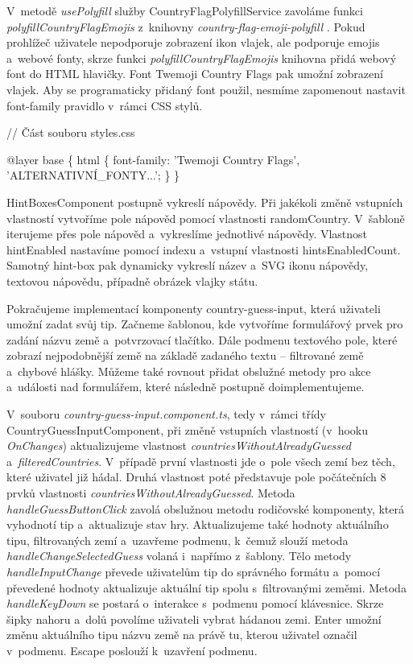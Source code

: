 V~metodě \emph{usePolyfill} služby CountryFlagPolyfillService zavoláme funkci \emph{polyfillCountryFlagEmojis} z~knihovny \emph{country-flag-emoji-polyfill} \cite{countryflagemojipolyfill}. 
Pokud prohlížeč uživatele nepodporuje zobrazení ikon vlajek, ale podporuje emojis a~webové fonty, skrze funkci \emph{polyfillCountryFlagEmojis} knihovna přidá webový font do HTML hlavičky. 
Font Twemoji Country Flags pak umožní zobrazení vlajek. Aby se programaticky přidaný font použil, nesmíme zapomenout nastavit font-family pravidlo v~rámci CSS stylů.

\begin{prog}
// Část souboru styles.css

@layer base \{
  html \{
    font-family: 'Twemoji Country Flags', 'ALTERNATIVNÍ_FONTY...';
  \}
\}
\end{prog}

HintBoxesComponent postupně vykreslí nápovědy. Při jakékoli změně vstupních vlastností vytvoříme pole nápověd pomocí vlastnosti randomCountry. 
V~šabloně iterujeme přes pole nápověd a~vykreslíme jednotlivé nápovědy. Vlastnost hintEnabled nastavíme pomocí indexu a~vstupní vlastnosti hintsEnabledCount. 
Samotný hint-box pak dynamicky vykreslí název a~SVG ikonu nápovědy, textovou nápovědu, případně obrázek vlajky státu.

Pokračujeme implementací komponenty country-guess-input, která uživateli umožní zadat svůj tip. 
Začneme šablonou, kde vytvoříme formulářový prvek pro zadání názvu země a~potvrzovací tlačítko. 
Dále podmenu textového pole, které zobrazí nejpodobnější země na základě zadaného textu -- filtrované země a~chybové hlášky. 
Můžeme také rovnout přidat obslužné metody pro akce a~události nad formulářem, které následně postupně doimplementujeme.

V~souboru \emph{country-guess-input.component.ts}, tedy v~rámci třídy CountryGuessInputComponent, při změně vstupních vlastností (v~hooku \emph{OnChanges}) aktualizujeme vlastnost \emph{countriesWithoutAlreadyGuessed} a~\emph{filteredCountries}. 
V~případě první vlastnosti jde o~pole všech zemí bez těch, které uživatel již hádal. Druhá vlastnost poté představuje pole počátečních 8 prvků vlastnosti \emph{countriesWithoutAlreadyGuessed}. 
Metoda \emph{handleGuessButtonClick} zavolá obslužnou metodu rodičovské komponenty, která vyhodnotí tip a~aktualizuje stav hry. 
Aktualizujeme také hodnoty aktuálního tipu, filtrovaných zemí a~uzavřeme podmenu, k~čemuž slouží metoda \emph{handleChangeSelectedGuess} volaná i~napřímo z~šablony. 
Tělo metody \emph{handleInputChange} převede uživatelům tip do správného formátu a~pomocí převedené hodnoty aktualizuje aktuální tip spolu s~filtrovanými zeměmi.
Metoda \emph{handleKeyDown} se postará o~interakce s~podmenu pomocí klávesnice. Skrze šipky nahoru a~dolů povolíme uživateli vybrat hádanou zemi. 
Enter umožní změnu aktuálního tipu názvu země na právě tu, kterou uživatel označil v~podmenu. Escape poslouží k~uzavření podmenu.

